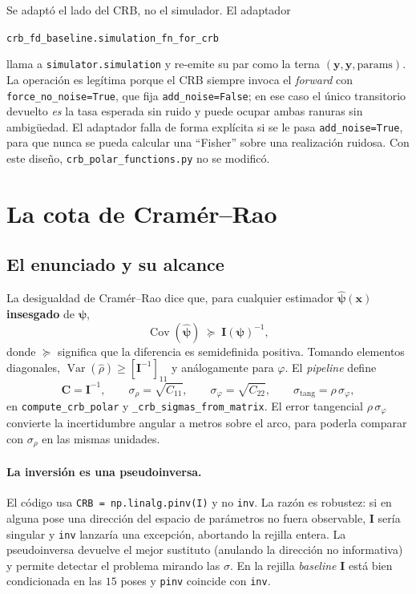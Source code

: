 \documentclass[11pt,a4paper]{article}
\newcommand{\vect}[1]{\boldsymbol{#1}}
\newcommand{\matr}[1]{\mathbf{#1}}
\newcommand{\code}[1]{\texttt{#1}}
\DeclareMathOperator{\Cov}{Cov}
\theoremstyle{definition}
\theoremstyle{plain}
\begin{document}
Se adaptó el lado del CRB, no el simulador. El adaptador
%
\begin{center}
\code{crb\_fd\_baseline.simulation\_fn\_for\_crb}
\end{center}
%
llama a \code{simulator.simulation} y re-emite su par como la terna
$(\vect y,\vect y,\text{params})$. La operación es legítima porque el CRB
siempre invoca el \emph{forward} con \code{force\_no\_noise=True}, que fija
\code{add\_noise=False}; en ese caso el único transitorio devuelto \emph{es} la
tasa esperada sin ruido y puede ocupar ambas ranuras sin ambigüedad. El
adaptador falla de forma explícita si se le pasa \code{add\_noise=True}, para
que nunca se pueda calcular una \enquote{Fisher} sobre una realización
ruidosa. Con este diseño, \code{crb\_polar\_functions.py} no se modificó.

\section{La cota de Cramér--Rao}
\label{sec:crb}

\subsection{El enunciado y su alcance}

La desigualdad de Cramér--Rao dice que, para cualquier estimador
$\hat{\vect\psi}(\vect x)$ \textbf{insesgado} de $\vect\psi$,
%
\begin{equation}
\label{eq:crb}
\Cov(\hat{\vect\psi}) \;\succeq\; \matr I(\vect\psi)^{-1} ,
\end{equation}
%
donde $\succeq$ significa que la diferencia es semidefinida positiva. Tomando
elementos diagonales, $\operatorname{Var}(\hat\rho)\ge[\matr I^{-1}]_{11}$ y
análogamente para $\varphi$. El \emph{pipeline} define
%
\begin{equation}
\label{eq:sigmas}
\matr C = \matr I^{-1},\qquad
\sigma_\rho=\sqrt{C_{11}},\qquad
\sigma_\varphi=\sqrt{C_{22}},\qquad
\sigma_{\text{tang}} = \rho\,\sigma_\varphi ,
\end{equation}
%
en \code{compute\_crb\_polar} y \code{\_crb\_sigmas\_from\_matrix}. El error
tangencial $\rho\,\sigma_\varphi$ convierte la incertidumbre angular a metros
sobre el arco, para poderla comparar con $\sigma_\rho$ en las mismas unidades.

\paragraph{La inversión es una pseudoinversa.}
El código usa \code{CRB = np.linalg.pinv(I)} y no \code{inv}. La razón es
robustez: si en alguna pose una dirección del espacio de parámetros no fuera
observable, $\matr I$ sería singular y \code{inv} lanzaría una excepción,
abortando la rejilla entera. La pseudoinversa devuelve el mejor sustituto
(anulando la dirección no informativa) y permite detectar el problema mirando
las $\sigma$. En la rejilla \emph{baseline} $\matr I$ está bien condicionada en
las $15$ poses y \code{pinv} coincide con \code{inv}.
\end{document}

